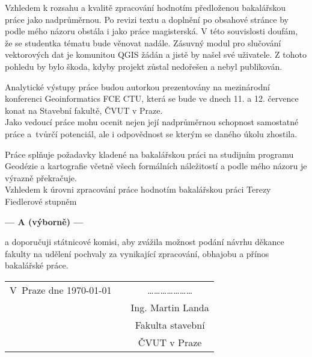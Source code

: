 \documentclass[czech,11pt,a4paper]{article}
\begin{document}
Vzhledem k rozsahu a kvalitě zpracování hodnotím předloženou
bakalářskou práce jako nadprůměrnou. Po revizi textu a doplnění po
obsahové stránce by podle mého názoru obstála i jako práce
magisterská. V této souvislosti doufám, že se studentka tématu bude
věnovat nadále. Zásuvný modul pro slučování vektorových dat je
komunitou QGIS žádán a jistě by našel své uživatele. Z tohoto pohledu
by bylo škoda, kdyby projekt zůstal nedořešen a nebyl publikován.

Analytické výstupy práce budou autorkou prezentovány na mezinárodní
konferenci Geoinformatics FCE CTU, která se bude ve dnech 11. a
12. července konat na Stavební fakultě, ČVUT v Praze.
\\

Jako vedoucí práce mohu ocenit nejen její nadprůměrnou schopnost
samostatné práce a~tvůrčí potenciál, ale i odpovědnost se kterým se
daného úkolu zhostila. 

Práce splňuje požadavky kladené na bakalářskou práci na studijním
programu Geodézie a kartografie včetně všech formálních náležitostí a
podle mého názoru je výrazně překračuje. \\

Vzhledem k úrovni zpracování práce hodnotím bakalářskou práci Terezy
Fiedlerové stupněm

\begin{center}
{\bf --- A (výborně)  ---}
\end{center}

a doporučuji státnicové komisi, aby zvážila možnost podání návrhu
děkance fakulty na udělení pochvaly za vynikající zpracování, obhajobu
a přínos bakalářské práce.

\vspace{2cm}

\begin{tabular}{lp{}c}
V~Praze dne \today & & \ldots\ldots\ldots\ldots\ldots\ldots\ldots \\
& & Ing. Martin Landa \\
& & Fakulta stavební \\
& & ČVUT v Praze \\
\end{tabular}
\end{document}
